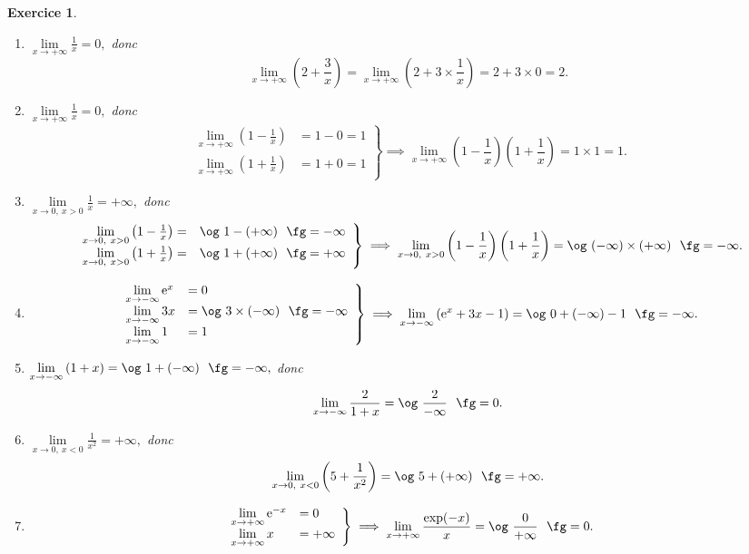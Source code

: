 \documentclass[10pt]{article}
\newtheorem{exo}{Exercice}
\begin{document}
\begin{exo}

\begin{enumerate}
\item $\lim\limits_{x\to +\infty}\frac{1}{x}=0,$ donc 
\[\lim\limits_{x\to +\infty}\left(2+\frac{3}{x}\right)=\lim\limits_{x\to +\infty}\left(2+3\times \frac{1}{x}\right)=2+3\times 0=2.\]
\item $\lim\limits_{x\to +\infty}\frac{1}{x}=0,$ donc
\[
\left.
    \begin{array}{ll}
        \lim\limits_{x\to +\infty}\left(1-\frac{1}{x}\right)&= 1-0=1 \\
        \lim\limits_{x\to +\infty}\left(1+\frac{1}{x}\right)&= 1+0=1
    \end{array}
\right \}\implies \lim\limits_{x\to +\infty}\left(1-\frac{1}{x}\right)\left(1+\frac{1}{x}\right)=  1\times 1=1.
\]
\item $\lim\limits_{x\to 0,~x>0}\frac{1}{x}=+\infty,$ donc
\[
\left.
    \begin{array}{ll}
        \lim\limits_{x\to 0,~x>0}\left(1-\frac{1}{x}\right)= & \text{\og}~1-(+\infty)~\text{ \fg}=-\infty\\
        \lim\limits_{x\to 0,~x>0}\left(1+\frac{1}{x}\right)= & \text{\og}~1+(+\infty)~\text{ \fg}=+\infty
    \end{array}
\right \}\implies \lim\limits_{x\to 0,~x>0}\left(1-\frac{1}{x}\right)\left(1+\frac{1}{x}\right)= \text{\og}~(-\infty)\times(+\infty)~\text{ \fg}=-\infty.
\]
\item \[
\left.
    \begin{array}{ll}
        \lim\limits_{x\to -\infty}\text{e}^{x}&= 0 \\
        \lim\limits_{x\to -\infty}3x&= \text{\og}~3\times(-\infty)~\text{ \fg}=-\infty\\
        \lim\limits_{x\to -\infty}1&= 1
    \end{array}
\right \}\implies \lim\limits_{x\to -\infty}\left(\text{e}^{x}+3x-1\right)= \text{\og}~0+(-\infty)-1~\text{ \fg}=-\infty.
\]
\item $\lim\limits_{x\to -\infty}\left(1+x\right)=\text{\og}~1+(-\infty)~\text{ \fg}=-\infty,$ donc
\[\lim\limits_{x\to -\infty}\frac{2}{1+x}=\text{\og}~\frac{2}{-\infty}~\text{ \fg}=0.\]
\item $\lim\limits_{x\to 0,~x<0}\frac{1}{x^2}=+\infty,$ donc
\[\lim\limits_{x\to 0,~x<0}\left(5+\frac{1}{x^2}\right)=\text{\og}~5+(+\infty)~\text{ \fg}=+\infty.\]
\item
\[\left.
    \begin{array}{ll}
        \lim\limits_{x\to +\infty}\text{e}^{-x}&= 0 \\
        \lim\limits_{x\to +\infty}x&=+\infty
    \end{array}
\right \}\implies \lim\limits_{x\to +\infty}\frac{\exp(-x)}{x}= \text{\og}~\frac{0}{+\infty}~\text{ \fg}=0.
\]
\end{enumerate}

\end{exo}
\end{document}
